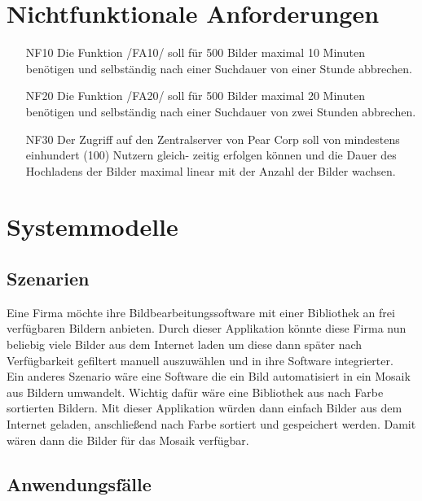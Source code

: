 \documentclass[parskip=full]{scrartcl}
\begin{document}
\section{Nichtfunktionale Anforderungen}
\begin{itemize}[nosep]
\item[NF10] Die Funktion /FA10/ soll für 500 Bilder maximal 10 Minuten benötigen und selbständig nach einer Suchdauer von einer Stunde abbrechen.
\item[NF20] Die Funktion /FA20/ soll für 500 Bilder maximal 20 Minuten benötigen und selbständig nach einer Suchdauer von zwei Stunden abbrechen.
\item[NF30] Der Zugriff auf den Zentralserver von Pear Corp soll von mindestens einhundert (100) Nutzern gleich-
zeitig erfolgen können und die Dauer des Hochladens der Bilder maximal linear mit der Anzahl der Bilder
wachsen.
\end{itemize}

\section{Systemmodelle}

\subsection{Szenarien}
\begin{flushleft}
    Eine Firma möchte ihre Bildbearbeitungssoftware mit einer Bibliothek an frei verfügbaren Bildern anbieten.
    Durch dieser Applikation könnte diese Firma nun beliebig viele Bilder aus dem Internet laden um diese dann später 
    nach Verfügbarkeit gefiltert manuell auszuwählen und in ihre Software integrierter. \\
    \vspace{1cm}
    Ein anderes Szenario wäre eine Software die ein Bild automatisiert in ein Mosaik aus Bildern umwandelt. Wichtig dafür wäre eine Bibliothek aus nach Farbe sortierten Bildern.
    Mit dieser Applikation würden dann einfach Bilder aus dem Internet geladen, anschließend nach Farbe sortiert und gespeichert werden. Damit wären dann die Bilder für das Mosaik verfügbar.
\end{flushleft}

\subsection{Anwendungsfälle}
\end{document}
